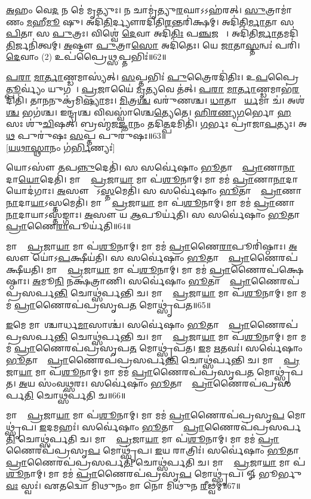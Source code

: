\ul{𑌅}𑌹𑌂 𑌵𑍇\ul{𑌦} 𑌨 𑌮𑍇॑ 𑌮𑍃𑌤𑍍𑌯𑍁𑌃। 𑌨 𑌚𑌾𑌮𑍃॑𑌤𑍍𑌯𑍁\ul{𑌰}𑌘𑌾𑌽𑌽𑌹॑𑌰𑌤𑍍‌। 
\ul{𑌸𑍁}𑌤𑍍𑌰𑌾𑌮𑌾॑𑌣𑌂 \ul{𑌮}𑌹𑍀\ul{𑌮𑍂} 𑌷𑍁। 𑌅𑌦𑌿॑\ul{𑌤𑌿}𑌰𑍍𑌦𑍍𑌯𑍗𑌰𑌦𑌿॑𑌤𑌿\ul{𑌰}𑌨𑍍𑌤𑌰𑌿॑𑌕𑍍𑌷𑌮𑍍। 
𑌅𑌦𑌿॑𑌤𑌿\ul{𑌰𑍍𑌮𑌾}𑌤𑌾 𑌸 \ul{𑌪𑌿}𑌤𑌾 𑌸 \ul{𑌪𑍁}𑌤𑍍𑌰𑌃। 𑌵𑌿𑌶𑍍𑌵𑍇॑ \ul{𑌦𑍇}𑌵𑌾 𑌅𑌦𑌿॑\ul{𑌤𑌿𑌃} 𑌪\ul{𑌞𑍍𑌚}𑌜𑌨𑌾𑌃᳚। 
𑌅𑌦𑌿॑𑌤𑌿\ul{𑌰𑍍𑌜𑌾}𑌤𑌮𑌦𑌿॑\ul{𑌤𑌿}𑌰𑍍𑌜𑌨𑌿॑𑌤𑍍𑌵𑌮𑍍‌। \ul{𑌅}𑌷𑍍𑌟𑍗 \ul{𑌪𑍁}𑌤𑍍𑌰𑌾\ul{𑌸𑍋} 𑌅𑌦𑌿॑𑌤𑍇𑌃। 
𑌯𑍇 \ul{𑌜𑌾}𑌤𑌾\ul{𑌸𑍍𑌤}𑌨𑍍𑌵𑌃॑ 𑌪𑌰𑌿॑। \ul{𑌦𑍇}𑌵𑌾𑌂 (2) 𑌉𑌪॑𑌪𑍍𑌰𑍈\ul{𑌥𑍍𑌸}𑌪𑍍𑌤𑌭𑌿𑌃॑॥62॥


\ul{𑌪}\ul{𑌰𑌾} \ul{𑌮𑌾}\ul{𑌰𑍍𑌤𑌾}𑌣𑍍𑌡𑌮𑌾𑌸𑍍𑌯॑𑌤𑍍‌। \ul{𑌸}𑌪𑍍𑌤𑌭𑌿𑌃॑ \ul{𑌪𑍁}𑌤𑍍𑌰𑍈𑌰𑌦𑌿॑𑌤𑌿𑌃। 
𑌉\ul{𑌪}𑌪𑍍𑌰𑍈\ul{𑌤𑍍𑌪𑍂}𑌰𑍍𑌵𑍍𑌯𑌂॑ 𑌯𑍁𑌗𑌮𑍍᳚। \ul{𑌪𑍍𑌰}𑌜𑌾𑌯𑍈॑ \ul{𑌮𑍃}𑌤𑍍𑌯𑌵𑍇 𑌤॑𑌤𑍍‌। 
\ul{𑌪}\ul{𑌰𑌾} \ul{𑌮𑌾}\ul{𑌰𑍍𑌤𑌾}𑌣𑍍𑌡𑌮𑌾𑌭॑\ul{𑌰}𑌦𑌿𑌤𑌿॑। 𑌤𑌾𑌨𑌨𑍁𑌕𑍍𑌰॑𑌮𑌿\ul{𑌷𑍍𑌯𑌾}𑌮𑌃। 
\ul{𑌮𑌿}𑌤𑍍𑌰\ul{𑌶𑍍𑌚} 𑌵𑌰𑍁॑𑌣𑌶𑍍𑌚। \ul{𑌧𑌾}𑌤𑌾 𑌚𑌾᳚\ul{𑌰𑍍𑌯}𑌮𑌾 𑌚॑। 
𑌅𑌶॑\ul{𑌶𑍍𑌚} 𑌭𑌗॑𑌶𑍍𑌚। 𑌇𑌨𑍍𑌦𑍍𑌰𑌶𑍍𑌚 𑌵𑌿𑌵𑌸𑍍𑌵𑌾॑𑌶𑍍𑌚𑍇\ul{𑌤𑍍𑌯𑍇}𑌤𑍇। 
\ul{𑌹𑌿}\ul{𑌰}\ul{𑌣𑍍𑌯}\ul{𑌗}𑌰𑍍𑌭𑍋 \ul{𑌹}\ul{}𑌸𑌃 𑌶𑍁॑\ul{𑌚𑌿}𑌷𑌤𑍍‌। 
𑌬𑍍𑌰𑌹𑍍𑌮॑𑌜\ul{𑌜𑍍𑌞𑌾}𑌨𑌂 𑌤𑌦𑌿\ul{𑌤𑍍𑌪}𑌦𑌮𑌿𑌤𑌿॑। \ul{𑌗}𑌰𑍍𑌭𑌃 𑌪𑍍𑌰𑌾॑𑌜𑌾\ul{𑌪}𑌤𑍍𑌯𑌃। 
𑌅\ul{𑌥} 𑌪𑍁𑌰𑍁॑𑌷𑌃 \ul{𑌸}𑌪𑍍𑌤 𑌪𑍁𑌰𑍁॑𑌷𑌃॥63॥\\\mbox{}
[\ul{𑌯}\ul{𑌥𑌾}\ul{𑌸𑍍𑌥𑌾}𑌨𑌂 𑌗॑\ul{𑌰𑍍𑌭𑌿}𑌣𑍍𑌯𑌃॑]\anuvakamend

𑌯𑍋𑌽𑌸𑍗॑ \ul{𑌤}𑌪\ul{𑌨𑍍𑌨𑍁}𑌦𑍇𑌤𑌿॑। 𑌸 𑌸𑌰𑍍𑌵𑍇॑𑌷𑌾𑌂 \ul{𑌭𑍂}𑌤𑌾𑌨𑌾𑌂᳚ \ul{𑌪𑍍𑌰𑌾}𑌣𑌾\ul{𑌨𑌾}𑌦𑌾\ul{𑌯𑍋}𑌦𑍇𑌤𑌿॑। 
𑌮𑌾 𑌮𑍇᳚ \ul{𑌪𑍍𑌰}𑌜𑌾\ul{𑌯𑌾} 𑌮𑌾 𑌪॑\ul{𑌶𑍂}𑌨𑌾𑌮𑍍‌। 𑌮𑌾 𑌮𑌮॑ \ul{𑌪𑍍𑌰𑌾}𑌣𑌾\ul{𑌨𑌾}𑌦𑌾𑌯𑍋𑌦॑𑌗𑌾𑌃। 
\ul{𑌅}𑌸𑍗 𑌯𑍋᳚𑌽\ul{𑌸𑍍𑌤}𑌮𑍇𑌤𑌿॑। 𑌸 𑌸𑌰𑍍𑌵𑍇॑𑌷𑌾𑌂 \ul{𑌭𑍂}𑌤𑌾𑌨𑌾𑌂᳚ \ul{𑌪𑍍𑌰𑌾}𑌣𑌾\ul{𑌨𑌾}𑌦𑌾\ul{𑌯𑌾}𑌽𑌸𑍍𑌤𑌮𑍇𑌤𑌿॑। 
𑌮𑌾 𑌮𑍇᳚ \ul{𑌪𑍍𑌰}𑌜𑌾\ul{𑌯𑌾} 𑌮𑌾 𑌪॑\ul{𑌶𑍂}𑌨𑌾𑌮𑍍‌। 𑌮𑌾 𑌮𑌮॑ \ul{𑌪𑍍𑌰𑌾}𑌣𑌾\ul{𑌨𑌾}𑌦𑌾𑌯𑌾𑌽𑌸𑍍𑌤॑𑌙𑍍𑌗𑌾𑌃। 
\ul{𑌅}𑌸𑍗 𑌯 \ul{𑌆}𑌪𑍂𑌰𑍍𑌯॑𑌤𑌿। 𑌸 𑌸𑌰𑍍𑌵𑍇॑𑌷𑌾𑌂 \ul{𑌭𑍂}𑌤𑌾𑌨𑌾𑌂᳚ \ul{𑌪𑍍𑌰𑌾}𑌣𑍈\ul{𑌰𑌾}𑌪𑍂𑌰𑍍𑌯॑𑌤𑌿॥64॥


𑌮𑌾 𑌮𑍇᳚ \ul{𑌪𑍍𑌰}𑌜𑌾\ul{𑌯𑌾} 𑌮𑌾 𑌪॑\ul{𑌶𑍂}𑌨𑌾𑌮𑍍‌। 𑌮𑌾 𑌮𑌮॑ \ul{𑌪𑍍𑌰𑌾}𑌣𑍈\ul{𑌰𑌾}𑌪𑍂𑌰𑌿॑𑌷𑍍𑌠𑌾𑌃। 
\ul{𑌅}𑌸𑍗 𑌯𑍋॑𑌽\ul{𑌪}𑌕𑍍𑌷𑍀𑌯॑𑌤𑌿। 𑌸 𑌸𑌰𑍍𑌵𑍇॑𑌷𑌾𑌂 \ul{𑌭𑍂}𑌤𑌾𑌨𑌾𑌂᳚ \ul{𑌪𑍍𑌰𑌾}𑌣𑍈𑌰𑌪॑𑌕𑍍𑌷𑍀𑌯𑌤𑌿। 
𑌮𑌾 𑌮𑍇᳚ \ul{𑌪𑍍𑌰}𑌜𑌾\ul{𑌯𑌾} 𑌮𑌾 𑌪॑\ul{𑌶𑍂}𑌨𑌾𑌮𑍍‌। 𑌮𑌾 𑌮𑌮॑ \ul{𑌪𑍍𑌰𑌾}𑌣𑍈𑌰𑌪॑𑌕𑍍𑌷𑍇𑌷𑍍𑌠𑌾𑌃। 
\ul{𑌅}𑌮𑍂\ul{𑌨𑌿} 𑌨𑌕𑍍𑌷॑𑌤𑍍𑌰𑌾𑌣𑌿। 𑌸𑌰𑍍𑌵𑍇॑𑌷𑌾𑌂 \ul{𑌭𑍂}𑌤𑌾𑌨𑌾𑌂᳚ \ul{𑌪𑍍𑌰𑌾}𑌣𑍈𑌰𑌪॑𑌪𑍍𑌰𑌸𑌰𑍍𑌪\ul{𑌨𑍍𑌤𑌿} 𑌚𑍋𑌥𑍍𑌸॑𑌰𑍍𑌪𑌨𑍍𑌤𑌿 𑌚। 
𑌮𑌾 𑌮𑍇᳚ \ul{𑌪𑍍𑌰}𑌜𑌾\ul{𑌯𑌾} 𑌮𑌾 𑌪॑\ul{𑌶𑍂}𑌨𑌾𑌮𑍍‌। 𑌮𑌾 𑌮𑌮॑ \ul{𑌪𑍍𑌰𑌾}𑌣𑍈𑌰𑌪॑𑌪𑍍𑌰𑌸𑍃𑌪\ul{𑌤} 𑌮𑍋𑌥𑍍𑌸𑍃॑𑌪𑌤॥65॥


\ul{𑌇}𑌮𑍇 𑌮𑌾𑌸𑌾᳚𑌶𑍍𑌚𑌾𑌰𑍍𑌧\ul{𑌮𑌾}𑌸𑌾𑌶𑍍𑌚॑। 𑌸𑌰𑍍𑌵𑍇॑𑌷𑌾𑌂 \ul{𑌭𑍂}𑌤𑌾𑌨𑌾𑌂᳚ \ul{𑌪𑍍𑌰𑌾}𑌣𑍈𑌰𑌪॑𑌪𑍍𑌰𑌸𑌰𑍍𑌪\ul{𑌨𑍍𑌤𑌿} 𑌚𑍋𑌥𑍍𑌸॑𑌰𑍍𑌪𑌨𑍍𑌤𑌿 𑌚। 
𑌮𑌾 𑌮𑍇᳚ \ul{𑌪𑍍𑌰}𑌜𑌾\ul{𑌯𑌾} 𑌮𑌾 𑌪॑\ul{𑌶𑍂}𑌨𑌾𑌮𑍍‌। 𑌮𑌾 𑌮𑌮॑ \ul{𑌪𑍍𑌰𑌾}𑌣𑍈𑌰𑌪॑𑌪𑍍𑌰𑌸𑍃𑌪\ul{𑌤} 𑌮𑍋𑌥𑍍𑌸𑍃॑𑌪𑌤। 
\ul{𑌇}𑌮 \ul{𑌋}𑌤𑌵𑌃॑। 𑌸𑌰𑍍𑌵𑍇॑𑌷𑌾𑌂 \ul{𑌭𑍂}𑌤𑌾𑌨𑌾𑌂᳚ \ul{𑌪𑍍𑌰𑌾}𑌣𑍈𑌰𑌪॑𑌪𑍍𑌰𑌸𑌰𑍍𑌪\ul{𑌨𑍍𑌤𑌿} 𑌚𑍋𑌥𑍍𑌸॑𑌰𑍍𑌪𑌨𑍍𑌤𑌿 𑌚। 
𑌮𑌾 𑌮𑍇᳚ \ul{𑌪𑍍𑌰}𑌜𑌾\ul{𑌯𑌾} 𑌮𑌾 𑌪॑\ul{𑌶𑍂}𑌨𑌾𑌮𑍍‌। 𑌮𑌾 𑌮𑌮॑ \ul{𑌪𑍍𑌰𑌾}𑌣𑍈𑌰𑌪॑𑌪𑍍𑌰𑌸𑍃𑌪\ul{𑌤} 𑌮𑍋𑌥𑍍𑌸𑍃॑𑌪𑌤। 
\ul{𑌅}𑌯 𑌸𑌂॑𑌵\ul{𑌥𑍍𑌸}𑌰𑌃। 𑌸𑌰𑍍𑌵𑍇॑𑌷𑌾𑌂 \ul{𑌭𑍂}𑌤𑌾𑌨𑌾𑌂᳚ \ul{𑌪𑍍𑌰𑌾}𑌣𑍈𑌰𑌪॑𑌪𑍍𑌰𑌸𑌰𑍍𑌪\ul{𑌤𑌿} 𑌚𑍋𑌥𑍍𑌸॑𑌰𑍍𑌪𑌤𑌿 𑌚॥66॥


𑌮𑌾 𑌮𑍇᳚ \ul{𑌪𑍍𑌰}𑌜𑌾\ul{𑌯𑌾} 𑌮𑌾 𑌪॑\ul{𑌶𑍂}𑌨𑌾𑌮𑍍‌। 𑌮𑌾 𑌮𑌮॑ \ul{𑌪𑍍𑌰𑌾}𑌣𑍈𑌰𑌪॑𑌪𑍍𑌰𑌸𑍃\ul{𑌪} 𑌮𑍋𑌥𑍍𑌸𑍃॑𑌪। 
\ul{𑌇}𑌦𑌮𑌹𑌃॑। 𑌸𑌰𑍍𑌵𑍇॑𑌷𑌾𑌂 \ul{𑌭𑍂}𑌤𑌾𑌨𑌾𑌂᳚ \ul{𑌪𑍍𑌰𑌾}𑌣𑍈𑌰𑌪॑𑌪𑍍𑌰𑌸𑌰𑍍𑌪\ul{𑌤𑌿} 𑌚𑍋𑌥𑍍𑌸॑𑌰𑍍𑌪𑌤𑌿 𑌚। 
𑌮𑌾 𑌮𑍇᳚ \ul{𑌪𑍍𑌰}𑌜𑌾\ul{𑌯𑌾} 𑌮𑌾 𑌪॑\ul{𑌶𑍂}𑌨𑌾𑌮𑍍‌। 𑌮𑌾 𑌮𑌮॑ \ul{𑌪𑍍𑌰𑌾}𑌣𑍈𑌰𑌪॑𑌪𑍍𑌰𑌸𑍃\ul{𑌪} 𑌮𑍋𑌥𑍍𑌸𑍃॑𑌪। 
\ul{𑌇}𑌯 𑌰𑌾𑌤𑍍𑌰𑌿𑌃॑। 𑌸𑌰𑍍𑌵𑍇॑𑌷𑌾𑌂 \ul{𑌭𑍂}𑌤𑌾𑌨𑌾𑌂᳚ \ul{𑌪𑍍𑌰𑌾}𑌣𑍈𑌰𑌪॑𑌪𑍍𑌰𑌸𑌰𑍍𑌪\ul{𑌤𑌿} 𑌚𑍋𑌥𑍍𑌸॑𑌰𑍍𑌪𑌤𑌿 𑌚। 
𑌮𑌾 𑌮𑍇᳚ \ul{𑌪𑍍𑌰}𑌜𑌾\ul{𑌯𑌾} 𑌮𑌾 𑌪॑\ul{𑌶𑍂}𑌨𑌾𑌮𑍍‌। 𑌮𑌾 𑌮𑌮॑ \ul{𑌪𑍍𑌰𑌾}𑌣𑍈𑌰𑌪॑𑌪𑍍𑌰𑌸𑍃\ul{𑌪} 𑌮𑍋𑌥𑍍𑌸𑍃॑𑌪। 
𑍐 𑌭𑍂𑌰𑍍𑌭𑍁\ul{𑌵𑌃} 𑌸𑍍𑌵𑌃॑। 𑌏𑌤𑌦𑍍𑌵𑍋 𑌮𑌿𑌥𑍁𑌨𑌂 𑌮𑌾 𑌨𑍋 𑌮𑌿𑌥𑍁॑𑌨 \ul{𑌰𑍀}𑌢𑍍𑌵𑌮𑍍॥67॥\anuvakamend


